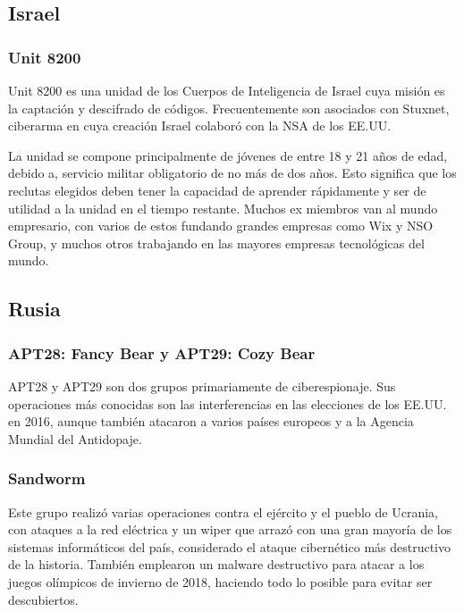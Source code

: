 \documentclass{article}
\begin{document}
\subsection{Israel}
\subsubsection{Unit 8200}
Unit 8200 es una unidad de los Cuerpos de Inteligencia de Israel cuya misión es la captación y descifrado de códigos. Frecuentemente son asociados con Stuxnet, ciberarma en cuya creación Israel colaboró con la NSA de los EE.UU. \autocite{washingtonpost-stuxnet}

La unidad se compone principalmente de jóvenes de entre 18 y 21 años de edad, debido a, servicio militar obligatorio de no más de dos años. Esto significa que los reclutas elegidos deben tener la capacidad de aprender rápidamente y ser de utilidad a la unidad en el tiempo restante. Muchos ex miembros van al mundo empresario, con varios de estos fundando grandes empresas como Wix y NSO Group, y muchos otros trabajando en las mayores empresas tecnológicas del mundo. \autocite{globes-unit-8200} \autocite{forbes-unit-8200}

\subsection{Rusia}
\subsubsection{APT28: Fancy Bear y APT29: Cozy Bear}
APT28 y APT29 son dos grupos primariamente de ciberespionaje. Sus operaciones más conocidas son las interferencias en las elecciones de los EE.UU. en 2016, aunque también atacaron a varios países europeos y a la Agencia Mundial del Antidopaje. \autocite{sslstore-apt28-apt29}

\subsubsection{Sandworm}
Este grupo realizó varias operaciones contra el ejército y el pueblo de Ucrania, con ataques a la red eléctrica y un wiper que arrazó con una gran mayoría de los sistemas informáticos del país, considerado el ataque cibernético más destructivo de la historia. También emplearon un malware destructivo para atacar a los juegos olímpicos de invierno de 2018, haciendo todo lo posible para evitar ser descubiertos. \autocite{wired-notpetya} \autocite{wired-olympic-destroyer}
\end{document}
